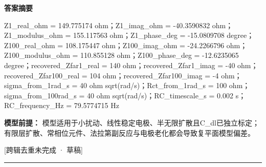 \documentclass[UTF8,11pt,a4paper]{ctexart}
\begin{document}
\noindent\textbf{答案摘要}\par
Z1\_real\_ohm = 149.775174 ohm；Z1\_imag\_ohm = -40.3590832 ohm；Z1\_modulus\_ohm = 155.117563 ohm；Z1\_phase\_deg = -15.0809708 degree；Z100\_real\_ohm = 108.175447 ohm；Z100\_imag\_ohm = -24.2266796 ohm；Z100\_modulus\_ohm = 110.855128 ohm；Z100\_phase\_deg = -12.6235065 degree；recovered\_Zfar1\_real = 140 ohm；recovered\_Zfar1\_imag = -40 ohm；recovered\_Zfar100\_real = 104 ohm；recovered\_Zfar100\_imag = -4 ohm；sigma\_from\_1rad\_s = 40 ohm sqrt(rad/s)；Rct\_from\_1rad\_s = 100 ohm；sigma\_from\_100rad\_s = 40 ohm sqrt(rad/s)；RC\_timescale\_s = 0.002 s；RC\_frequency\_Hz = 79.5774715 Hz\par
\noindent\textbf{模型前提：}
模型适用于小扰动、线性稳定电极、半无限扩散且C\_dl已独立标定；有限层扩散、常相位元件、法拉第副反应与电极老化都会导致复平面模型偏差。\par
\noindent\textcolor{red!65!black}{[跨辑去重未完成 · 草稿]} \par
\medskip\hrule\medskip
{}
\end{document}
